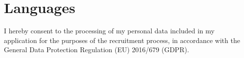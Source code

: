 \documentclass[11pt,a4paper,sans]{moderncv} %
\begin{document}
	
\section{Languages}

\bigskip
\bigskip

\small{I hereby consent to the processing of my personal data included in my application for the purposes of the recruitment process, in accordance with the General Data Protection Regulation (EU) 2016/679 (GDPR).}
\end{document}
